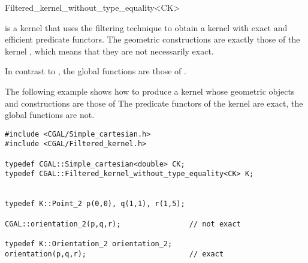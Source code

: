 
\begin{ccRefClass}{Filtered_kernel_without_type_equality<CK>}

\KernelRefLayout\gdef\ccTagOperatorLayout{\ccFalse}

\ccDefinition

\ccClassTemplateName is a kernel that uses the filtering technique
\cite{bbp-iayed-01} to obtain a kernel with exact and efficient
predicate functors.
The geometric constructions are exactly those
of the kernel , which means that they are not necessarily exact.

In contrast to , 
the global functions are those of .



\ccExample

The following example shows how to produce a kernel whose geometric
objects and constructions are those of 
The predicate functors of the kernel are exact, the global functions
are not.

\begin{verbatim}
#include <CGAL/Simple_cartesian.h>
#include <CGAL/Filtered_kernel.h>

typedef CGAL::Simple_cartesian<double> CK;
typedef CGAL::Filtered_kernel_without_type_equality<CK> K;


typedef K::Point_2 p(0,0), q(1,1), r(1,5);

CGAL::orientation_2(p,q,r);                // not exact

typedef K::Orientation_2 orientation_2;
orientation(p,q,r);                        // exact

\end{verbatim}



\end{ccRefClass}
